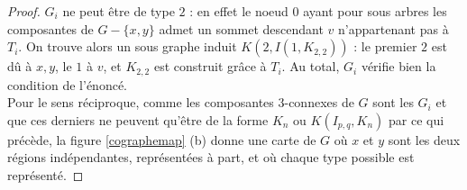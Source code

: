 \documentclass{scrartcl}
\begin{document}
\begin{flushleft}
\begin{proof}
    $G_i$ ne peut être de type $2$ : en effet le noeud $0$ ayant pour sous arbres les composantes de $G - \{x,y\}$ admet un sommet descendant
    $v$ n'appartenant pas à $T_i$. On trouve alors un sous graphe induit $K(2, I(1, K_{2,2}))$ : le premier $2$ est dû à $x,y$, le $1$ à $v$,
    et $K_{2,2}$ est construit grâce à $T_i$. Au total, $G_i$ vérifie bien la condition de l'énoncé.\\
    Pour le sens réciproque, comme les composantes $3$-connexes de $G$ sont les $G_i$ et que ces derniers ne peuvent qu'être de la forme
    $K_n$ ou $K(I_{p,q}, K_n)$ par ce qui précède, la figure \ref{cographemap} (b) donne une carte de $G$ où $x$ et $y$ sont les deux régions indépendantes,
    représentées à part, et où chaque type possible est représenté.
\end{proof}


\end{flushleft}
\end{document}
